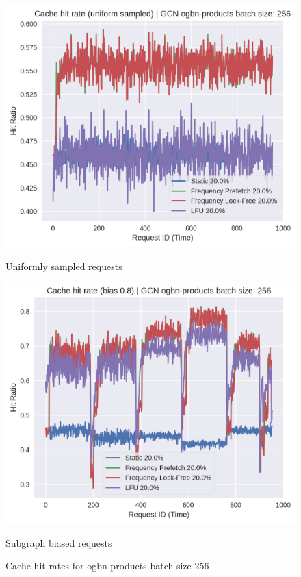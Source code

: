 \begin{figure}[h!]
    \centering
    \begin{minipage}[c]{0.48\textwidth}
        \centering
        \includegraphics[width=\textwidth]{figures/CROTc0.2.png}
        \caption*{Uniformly sampled requests}
    \end{minipage}
    \hfill
    \begin{minipage}[c]{0.48\textwidth}
        \centering
        \includegraphics[width=\textwidth]{figures/CROT_biased_c0.2.png}    
        \caption*{Subgraph biased requests}
    \end{minipage}
    \caption{Cache hit rates for ogbn-products batch size 256}
    \label{Eval: Hit Rate}
\end{figure}    

